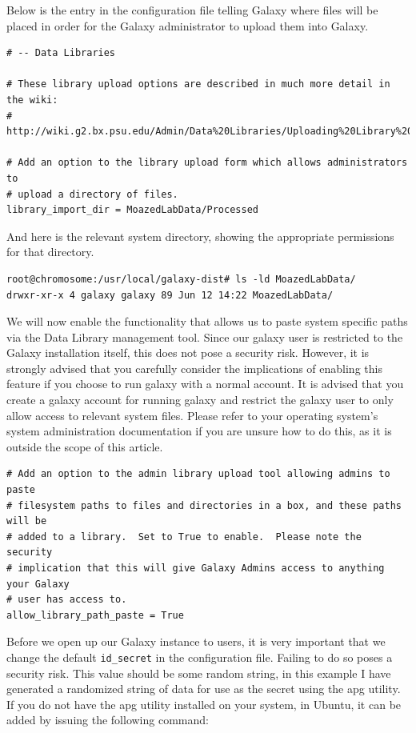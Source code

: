 \documentclass[a4paper,10pt]{article}
\begin{document}
Below is the entry in the configuration file telling Galaxy where files will be placed in order for the Galaxy administrator to upload them into Galaxy.

\begin{lstlisting}
# -- Data Libraries

# These library upload options are described in much more detail in the wiki:
# http://wiki.g2.bx.psu.edu/Admin/Data%20Libraries/Uploading%20Library%20Files

# Add an option to the library upload form which allows administrators to
# upload a directory of files.
library_import_dir = MoazedLabData/Processed
\end{lstlisting}

And here is the relevant system directory, showing the appropriate permissions for that directory.

\begin{lstlisting}
root@chromosome:/usr/local/galaxy-dist# ls -ld MoazedLabData/
drwxr-xr-x 4 galaxy galaxy 89 Jun 12 14:22 MoazedLabData/
\end{lstlisting}

We will now enable the functionality that allows us to paste system specific paths via the Data Library management tool.  Since our galaxy user is restricted to the Galaxy installation itself, this does not pose a security risk.  However, it is strongly advised that you carefully consider the implications of enabling this feature if you choose to run galaxy with a normal account.  It is advised that you create a galaxy account for running galaxy and restrict the galaxy user to only allow access to relevant system files.  Please refer to your operating system's system administration documentation if you are unsure how to do this, as it is outside the scope of this article.

\begin{lstlisting}
# Add an option to the admin library upload tool allowing admins to paste
# filesystem paths to files and directories in a box, and these paths will be
# added to a library.  Set to True to enable.  Please note the security
# implication that this will give Galaxy Admins access to anything your Galaxy
# user has access to.
allow_library_path_paste = True
\end{lstlisting}

Before we open up our Galaxy instance to users, it is very important that we change the default \texttt{\footnotesize{id\_secret}} in the configuration file.  Failing to do so poses a security risk.  This value should be some random string, in this example I have generated a randomized string of data for use as the secret using the apg utility.  If you do not have the apg utility installed on your system, in Ubuntu, it can be added by issuing the following command:
\end{document}
